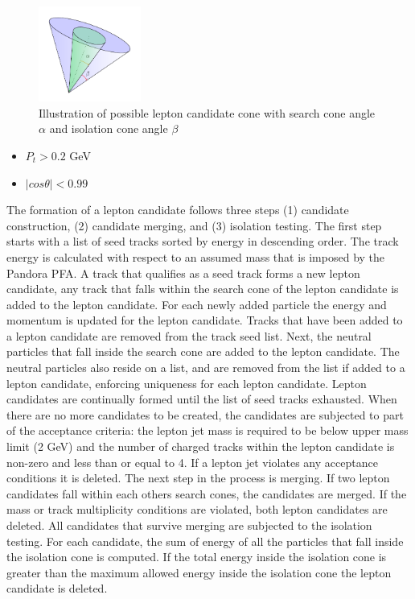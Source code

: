 \begin{figure}
\label{fig:cone}
\includegraphics[width=0.3\textwidth]{cone.pdf}
\caption{Illustration of possible lepton candidate cone with search cone angle $\alpha$ and isolation cone angle $\beta$}
\end{figure}
\begin{itemize}
\item $P_t > 0.2$ GeV
\item $|cos\theta| < 0.99$
\end{itemize}
The formation of a lepton candidate follows three steps (1) candidate construction, (2) candidate merging, and (3) isolation testing.
The first step starts with a list of seed tracks sorted by energy in descending order. The track energy is calculated with respect to an assumed mass that is imposed by the Pandora PFA.  A track that qualifies as a seed track forms a new lepton candidate, any track that falls within the search cone of the lepton candidate is added to the lepton candidate. For each newly added particle the energy and momentum is updated for the lepton candidate. Tracks that have been added to a lepton candidate are removed from the track seed list. Next, the neutral particles that fall inside the search cone are added to the lepton candidate. The neutral particles also reside on a list, and are removed from the list if added to a lepton candidate, enforcing uniqueness for each lepton candidate. Lepton candidates are continually formed until the list of seed tracks exhausted. When there are no more candidates to be created, the candidates are subjected to part of the acceptance criteria: the lepton jet mass is required to be below upper mass limit (2 GeV) and the number of charged tracks within the lepton candidate is non-zero and less than or equal to 4. If a lepton jet violates any acceptance conditions it is deleted. The next step in the process is merging. If two lepton candidates fall within each others search cones, the candidates are merged. If the mass or track multiplicity conditions are violated, both lepton candidates are deleted.  All  candidates that survive merging are subjected to the isolation testing. For each candidate, the sum of energy of all the particles that fall inside the isolation cone is computed. If the total energy inside the isolation cone is greater than the maximum allowed energy inside the isolation cone the lepton candidate is deleted.\\
